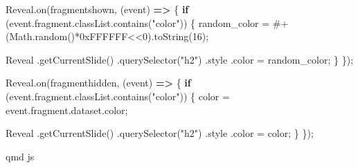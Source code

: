\documentclass[
  letterpaper,
  DIV=11,
  numbers=noendperiod]{scrreprt}
\newenvironment{Shaded}{\begin{snugshade}}{\end{snugshade}}
\newcommand{\AttributeTok}[1]{\textcolor[rgb]{0.40,0.45,0.13}{#1}}
\newcommand{\BaseNTok}[1]{\textcolor[rgb]{0.68,0.00,0.00}{#1}}
\newcommand{\BuiltInTok}[1]{\textcolor[rgb]{0.00,0.23,0.31}{#1}}
\newcommand{\ControlFlowTok}[1]{\textcolor[rgb]{0.00,0.23,0.31}{\textbf{#1}}}
\newcommand{\DecValTok}[1]{\textcolor[rgb]{0.68,0.00,0.00}{#1}}
\newcommand{\FunctionTok}[1]{\textcolor[rgb]{0.28,0.35,0.67}{#1}}
\newcommand{\KeywordTok}[1]{\textcolor[rgb]{0.00,0.23,0.31}{\textbf{#1}}}
\newcommand{\NormalTok}[1]{\textcolor[rgb]{0.00,0.23,0.31}{#1}}
\newcommand{\OperatorTok}[1]{\textcolor[rgb]{0.37,0.37,0.37}{#1}}
\newcommand{\StringTok}[1]{\textcolor[rgb]{0.13,0.47,0.30}{#1}}
\begin{document}
\begin{Shaded}
\begin{Highlighting}[]
\NormalTok{Reveal}\OperatorTok{.}\FunctionTok{on}\NormalTok{(}\StringTok{\textquotesingle{}fragmentshown\textquotesingle{}}\OperatorTok{,}\NormalTok{ (}\BuiltInTok{event}\NormalTok{) }\KeywordTok{=\textgreater{}}\NormalTok{ \{}
  \ControlFlowTok{if}\NormalTok{ (}\BuiltInTok{event}\OperatorTok{.}\AttributeTok{fragment}\OperatorTok{.}\AttributeTok{classList}\OperatorTok{.}\FunctionTok{contains}\NormalTok{(}\StringTok{"color"}\NormalTok{)) \{}
\NormalTok{ random\_color }\OperatorTok{=} \StringTok{\textquotesingle{}\#\textquotesingle{}}\OperatorTok{+}\NormalTok{(}\BuiltInTok{Math}\OperatorTok{.}\FunctionTok{random}\NormalTok{()}\OperatorTok{*}\BaseNTok{0xFFFFFF}\OperatorTok{\textless{}\textless{}}\DecValTok{0}\NormalTok{)}\OperatorTok{.}\FunctionTok{toString}\NormalTok{(}\DecValTok{16}\NormalTok{)}\OperatorTok{;}
  
\NormalTok{ Reveal}
      \OperatorTok{.}\FunctionTok{getCurrentSlide}\NormalTok{()}
      \OperatorTok{.}\FunctionTok{querySelector}\NormalTok{(}\StringTok{"h2"}\NormalTok{)}
      \OperatorTok{.}\AttributeTok{style}
      \OperatorTok{.}\AttributeTok{color} \OperatorTok{=}\NormalTok{ random\_color}\OperatorTok{;}
\NormalTok{  \}}
\NormalTok{\})}\OperatorTok{;}

\NormalTok{Reveal}\OperatorTok{.}\FunctionTok{on}\NormalTok{(}\StringTok{\textquotesingle{}fragmenthidden\textquotesingle{}}\OperatorTok{,}\NormalTok{ (}\BuiltInTok{event}\NormalTok{) }\KeywordTok{=\textgreater{}}\NormalTok{ \{}
  \ControlFlowTok{if}\NormalTok{ (}\BuiltInTok{event}\OperatorTok{.}\AttributeTok{fragment}\OperatorTok{.}\AttributeTok{classList}\OperatorTok{.}\FunctionTok{contains}\NormalTok{(}\StringTok{"color"}\NormalTok{)) \{}
\NormalTok{ color }\OperatorTok{=} \BuiltInTok{event}\OperatorTok{.}\AttributeTok{fragment}\OperatorTok{.}\AttributeTok{dataset}\OperatorTok{.}\AttributeTok{color}\OperatorTok{;}

\NormalTok{ Reveal}
      \OperatorTok{.}\FunctionTok{getCurrentSlide}\NormalTok{()}
      \OperatorTok{.}\FunctionTok{querySelector}\NormalTok{(}\StringTok{"h2"}\NormalTok{)}
      \OperatorTok{.}\AttributeTok{style}
      \OperatorTok{.}\AttributeTok{color} \OperatorTok{=}\NormalTok{ color}\OperatorTok{;}
\NormalTok{  \}}
\NormalTok{\})}\OperatorTok{;}
\end{Highlighting}
\end{Shaded}

qmd js
\end{document}
